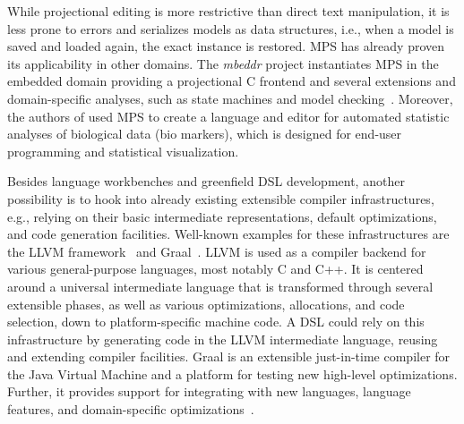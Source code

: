  While projectional editing is more restrictive
than direct text manipulation, it is less prone to errors and serializes models as
data structures, i.e., when a model is saved and loaded again, the exact instance is
restored. 
MPS has already proven its applicability in other domains. The \emph{mbeddr} project instantiates
MPS in the embedded domain providing a projectional C frontend and several extensions
and domain-specific analyses, such as state machines and model checking~\cite{Voelter2013}. 
Moreover, the authors of \cite{Benson2015} used MPS to create a language and
editor for automated statistic analyses of biological data (bio markers), which is 
designed for end-user programming and statistical visualization. 

Besides language workbenches and greenfield DSL development, another possibility is
to hook into already existing extensible compiler infrastructures, e.g., relying on
their basic intermediate representations, default optimizations, and code generation
facilities. Well-known examples for these infrastructures are the LLVM
framework~\cite{lattner_llvm_2004} and Graal~\cite{duboscq_graal_2013}. 
%
LLVM is used as a compiler backend for various general-purpose languages, most notably C and C++. It is
centered around a universal intermediate language that is transformed through several
extensible phases, as well as various optimizations, allocations, and code selection,
down to platform-specific machine code. A DSL could rely on this infrastructure by
generating code in the LLVM intermediate language, reusing and extending compiler
facilities.
%
Graal is an extensible just-in-time compiler for the Java Virtual Machine and a
platform for testing new high-level optimizations. Further, it provides support for
integrating with new languages, language features, and domain-specific
optimizations~\cite{wimmer_graal_2015}.

